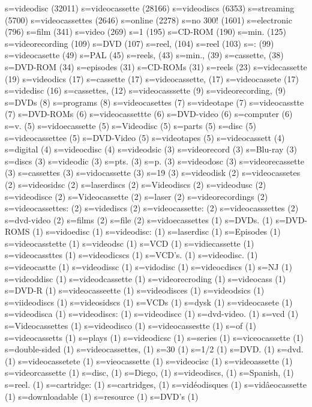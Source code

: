 	s=videodisc (32011)
	s=videocassette (28166)
	s=videodiscs (6353)
	s=streaming (5700)
	s=videocassettes (2646)
	s=online (2278)
	s=no 300! (1601)
	s=electronic (796)
	s=film (341)
	s=video (269)
	s=1 (195)
	s=CD-ROM (190)
	s=min. (125)
	s=videorecording (109)
	s=DVD (107)
	s=reel, (104)
	s=reel (103)
	s=: (99)
	s=videocasette (49)
	s=PAL (45)
	s=reels, (43)
	s=min., (39)
	s=cassette, (38)
	s=DVD-ROM (34)
	s=episodes (31)
	s=CD-ROMs (31)
	s=reels (23)
	s=videcassette (19)
	s=videodics (17)
	s=cassette (17)
	s=videocassette, (17)
	s=videocassete (17)
	s=videdisc (16)
	s=cassettes, (12)
	s=videocasssette (9)
	s=videorecording, (9)
	s=DVDs (8)
	s=programs (8)
	s=videocasettes (7)
	s=videotape (7)
	s=videocasstte (7)
	s=DVD-ROMs (6)
	s=videocassettte (6)
	s=DVD-video (6)
	s=computer (6)
	s=v. (5)
	s=vidoecassette (5)
	s=Videodisc (5)
	s=parts (5)
	s=disc (5)
	s=videocassettee (5)
	s=DVD-Video (5)
	s=videotapes (5)
	s=videocassett (4)
	s=digital (4)
	s=videocdisc (4)
	s=videodsic (3)
	s=videorecord (3)
	s=Blu-ray (3)
	s=discs (3)
	s=videodic (3)
	s=pts. (3)
	s=p. (3)
	s=videodosc (3)
	s=videorecassette (3)
	s=cassettes (3)
	s=vidocassette (3)
	s=19 (3)
	s=videodisk (2)
	s=videocassetes (2)
	s=videosidsc (2)
	s=laserdiscs (2)
	s=Videodiscs (2)
	s=videodusc (2)
	s=videodisce (2)
	s=Videocassette (2)
	s=laser (2)
	s=videorecordings (2)
	s=videocassettes: (2)
	s=vidediscs (2)
	s=videocassette: (2)
	s=videocasssettes (2)
	s=dvd-video (2)
	s=films (2)
	s=file (2)
	s=vidoecassettes (1)
	s=DVDs. (1)
	s=DVD-ROMS (1)
	s=vidoedisc (1)
	s=videodisc: (1)
	s=laserdisc (1)
	s=Episodes (1)
	s=videocasstette (1)
	s=videodsc (1)
	s=VCD (1)
	s=vidiecassette (1)
	s=videocassttes (1)
	s=videodicscs (1)
	s=VCD's. (1)
	s=videodisc. (1)
	s=videocastte (1)
	s=videodissc (1)
	s=vidodisc (1)
	s=videocdiscs (1)
	s=NJ (1)
	s=videoddisc (1)
	s=videodcassette (1)
	s=videorecroding (1)
	s=videocass (1)
	s=DVD-R (1)
	s=videocasseette (1)
	s=videodisces (1)
	s=videodsics (1)
	s=viideodiscs (1)
	s=videosidscs (1)
	s=VCDs (1)
	s=dysk (1)
	s=videocasete (1)
	s=videodisca (1)
	s=videodiscs: (1)
	s=videodiscc (1)
	s=dvd-video. (1)
	s=vcd (1)
	s=Videocassettes (1)
	s=videodisco (1)
	s=videocassestte (1)
	s=of (1)
	s=videocassetts (1)
	s=plays (1)
	s=videodicsc (1)
	s=series (1)
	s=viceocassette (1)
	s=double-sided (1)
	s=videocassettes, (1)
	s=30 (1)
	s=1/2 (1)
	s=DVD. (1)
	s=dvd. (1)
	s=videocassetete (1)
	s=vieocassette (1)
	s=videocisc (1)
	s=videoassette (1)
	s=videorcassette (1)
	s=disc, (1)
	s=Diego, (1)
	s=videodiscs, (1)
	s=Spanish, (1)
	s=reel. (1)
	s=cartridge: (1)
	s=cartridges, (1)
	s=vidéodisques (1)
	s=vidâeocassette (1)
	s=downloadable (1)
	s=resource (1)
	s=DVD's (1)